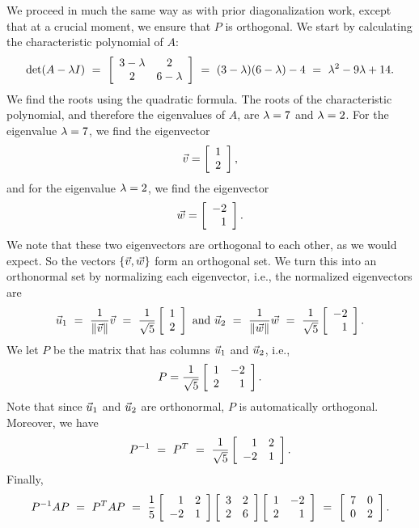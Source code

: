 \documentclass{ximera}
\begin{document}
\begin{solution}
  We proceed in much the same way as with prior diagonalization work,
  except that at a crucial moment, we ensure that $P$ is orthogonal.
  We start by calculating the characteristic polynomial of $A$:
  \begin{equation*}
    \det(A-\eigenvar I)
    ~=~ \startmat{cc}
      3-\eigenvar & 2 \\
      2 & 6-\eigenvar
    \stopmat
    ~=~ (3-\eigenvar)(6-\eigenvar) - 4
    ~=~ \eigenvar^2 - 9\eigenvar + 14.
  \end{equation*}
  We find the roots using the quadratic formula. The roots of the
  characteristic polynomial, and therefore the eigenvalues of $A$, are
  $\eigenvar=7$ and $\eigenvar=2$. For the eigenvalue $\eigenvar=7$,
  we find the eigenvector
  \begin{equation*}
    \vect{v} = \startmat{r} 1 \\ 2 \stopmat,
  \end{equation*}
  and for the eigenvalue $\eigenvar=2$, we find the eigenvector
  \begin{equation*}
    \vect{w} = \startmat{r} -2 \\ 1 \stopmat.
  \end{equation*}
  We note that these two eigenvectors are orthogonal to each other,
  as we would expect. So
  the vectors $\set{\vect{v},\vect{w}}$ form an orthogonal set. We
  turn this into an orthonormal set by normalizing each eigenvector,
  i.e., the normalized eigenvectors are
  \begin{equation*}
    \vect{u}_1
    ~=~ \frac{1}{\norm{\vect{v}}}\vect{v}
    ~=~ \frac{1}{\sqrt{5}} \startmat{r} 1 \\ 2 \stopmat
    \quad\mbox{and}\quad
    \vect{u}_2
    ~=~ \frac{1}{\norm{\vect{w}}}\vect{w}
    ~=~ \frac{1}{\sqrt{5}} \startmat{r} -2 \\ 1 \stopmat.
  \end{equation*}
  We let $P$ be the matrix that has columns $\vect{u}_1$ and
  $\vect{u}_2$, i.e.,
  \begin{equation*}
    P = \frac{1}{\sqrt{5}} \startmat{rr} 1 & -2 \\ 2 & 1 \stopmat.
  \end{equation*}
  Note that since $\vect{u}_1$ and $\vect{u}_2$ are orthonormal, $P$
  is automatically orthogonal. Moreover, we
  have
  \begin{equation*}
    P^{-1}
    ~=~ P^T
    ~=~ \frac{1}{\sqrt{5}} \startmat{rr} 1 & 2 \\ -2 & 1 \stopmat.
  \end{equation*}
  Finally,
  \begin{equation*}
    P^{-1}AP
    ~=~ P^TAP
    ~=~ \frac{1}{5}
    \startmat{rr} 1 & 2 \\ -2 & 1 \stopmat
    \startmat{rr} 3 & 2 \\ 2 & 6 \stopmat
    \startmat{rr} 1 & -2 \\ 2 & 1 \stopmat
    ~=~ \startmat{rr} 7 & 0 \\ 0 & 2 \stopmat.
  \end{equation*}
\end{solution}
\end{document}
